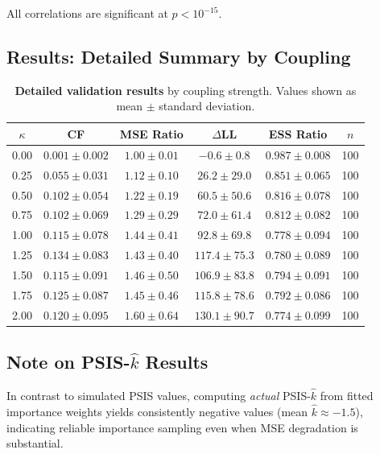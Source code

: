 \documentclass[10pt]{article} %
\theoremstyle{plain}
\theoremstyle{definition}
\begin{document}
\noindent All correlations are significant at $p < 10^{-15}$.

\subsection{Results: Detailed Summary by Coupling}

\begin{table}[!htbp]
\centering
\caption{\textbf{Detailed validation results} by coupling strength. Values shown as mean $\pm$ standard deviation.}
\label{tab:detailed-validation}
\begin{tabular}{cccccc}
\toprule
$\kappa$ & CF & MSE Ratio & $\Delta$LL & ESS Ratio & $n$ \\
\midrule
0.00 & $0.001 \pm 0.002$ & $1.00 \pm 0.01$ & $-0.6 \pm 0.8$ & $0.987 \pm 0.008$ & 100 \\
0.25 & $0.055 \pm 0.031$ & $1.12 \pm 0.10$ & $26.2 \pm 29.0$ & $0.851 \pm 0.065$ & 100 \\
0.50 & $0.102 \pm 0.054$ & $1.22 \pm 0.19$ & $60.5 \pm 50.6$ & $0.816 \pm 0.078$ & 100 \\
0.75 & $0.102 \pm 0.069$ & $1.29 \pm 0.29$ & $72.0 \pm 61.4$ & $0.812 \pm 0.082$ & 100 \\
1.00 & $0.115 \pm 0.078$ & $1.44 \pm 0.41$ & $92.8 \pm 69.8$ & $0.778 \pm 0.094$ & 100 \\
1.25 & $0.134 \pm 0.083$ & $1.43 \pm 0.40$ & $117.4 \pm 75.3$ & $0.780 \pm 0.089$ & 100 \\
1.50 & $0.115 \pm 0.091$ & $1.46 \pm 0.50$ & $106.9 \pm 83.8$ & $0.794 \pm 0.091$ & 100 \\
1.75 & $0.125 \pm 0.087$ & $1.45 \pm 0.46$ & $115.8 \pm 78.6$ & $0.792 \pm 0.086$ & 100 \\
2.00 & $0.120 \pm 0.095$ & $1.60 \pm 0.64$ & $130.1 \pm 90.7$ & $0.774 \pm 0.099$ & 100 \\
\bottomrule
\end{tabular}
\end{table}

\subsection{Note on PSIS-$\hat{k}$ Results}

In contrast to simulated PSIS values, computing \emph{actual} PSIS-$\hat{k}$ from fitted importance weights yields consistently negative values (mean $\hat{k} \approx -1.5$), indicating reliable importance sampling even when MSE degradation is substantial.
\end{document}
